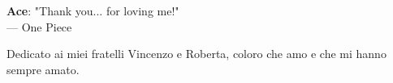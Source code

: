 \cleardoublepage
{}
\thispagestyle{empty}

\vspace*{3cm}

\begin{center}
     \textbf{Ace}: "Thank you... for loving me!" \\ \medskip
    --- One Piece
\end{center}

\medskip

\begin{center}
    Dedicato ai miei fratelli Vincenzo e Roberta, coloro che amo e che mi hanno sempre amato.
\end{center}
